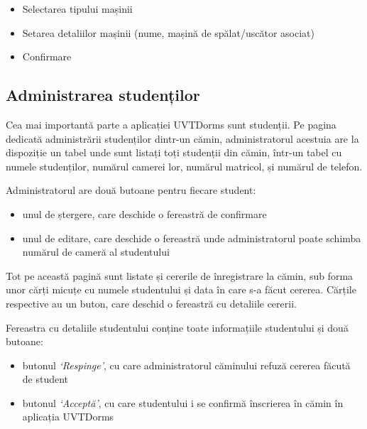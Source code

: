 \documentclass[12pt,a4paper]{report}
\theoremstyle{definition}
\theoremstyle{remark}
\begin{document}
\begin{itemize}
    \item Selectarea tipului mașinii
    \item Setarea detaliilor mașinii (nume, mașină de spălat/uscător asociat)
    \item Confirmare
\end{itemize}


\subsection{Administrarea studenților}

\par Cea mai importantă parte a aplicației UVTDorms sunt studenții. Pe pagina dedicată administrării studenților dintr-un cămin, administratorul acestuia are la dispoziție un tabel unde sunt listați toți studenții din cămin, într-un tabel cu numele studenților, numărul camerei lor, numărul matricol, și numărul de telefon.


\par Administratorul are două butoane pentru fiecare student:

\begin{itemize}
    \item unul de ștergere, care deschide o fereastră de confirmare
    \item unul de editare, care deschide o fereastră unde administratorul poate schimba numărul de cameră al studentului
\end{itemize}


\par Tot pe această pagină sunt listate și cererile de înregistrare la cămin, sub forma unor cărți micuțe cu numele studentului și data în care s-a făcut cererea. Cărțile respective au un buton, care deschid o fereastră cu detaliile cererii.


\par Fereastra cu detaliile studentului conține toate informațiile studentului și două butoane:

\begin{itemize}
    \item butonul \textit{`Respinge'}, cu care administratorul căminului refuză cererea făcută de student
    \item butonul \textit{`Acceptă'}, cu care studentului i se confirmă înscrierea în cămin în \textnormal{ap\-li\-ca\-ți\-a} UVTDorms
\end{itemize}
\end{document}

